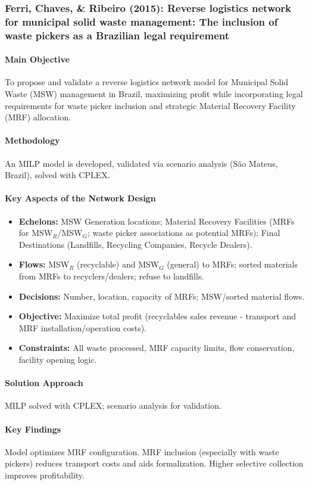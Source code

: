 \subsubsection{Ferri, Chaves, \& Ribeiro (2015): Reverse logistics network for municipal solid waste management: The inclusion of waste pickers as a Brazilian legal requirement}
\paragraph{Main Objective} To propose and validate a reverse logistics network model for Municipal Solid Waste (MSW) management in Brazil, maximizing profit while incorporating legal requirements for waste picker inclusion and strategic Material Recovery Facility (MRF) allocation.
\paragraph{Methodology} An MILP model is developed, validated via scenario analysis (São Mateus, Brazil), solved with CPLEX.
\paragraph{Key Aspects of the Network Design}
\begin{itemize}
    \item \textbf{Echelons:} MSW Generation locations; Material Recovery Facilities (MRFs for MSW$_{R}$/MSW$_{G}$; waste picker associations as potential MRFs); Final Destinations (Landfills, Recycling Companies, Recycle Dealers).
    \item \textbf{Flows:} MSW$_{R}$ (recyclable) and MSW$_{G}$ (general) to MRFs; sorted materials from MRFs to recyclers/dealers; refuse to landfills.
    \item \textbf{Decisions:} Number, location, capacity of MRFs; MSW/sorted material flows.
    \item \textbf{Objective:} Maximize total profit (recyclables sales revenue - transport and MRF installation/operation costs).
    \item \textbf{Constraints:} All waste processed, MRF capacity limits, flow conservation, facility opening logic.
\end{itemize}
\paragraph{Solution Approach} MILP solved with CPLEX; scenario analysis for validation.
\paragraph{Key Findings} Model optimizes MRF configuration. MRF inclusion (especially with waste pickers) reduces transport costs and aids formalization. Higher selective collection improves profitability.

